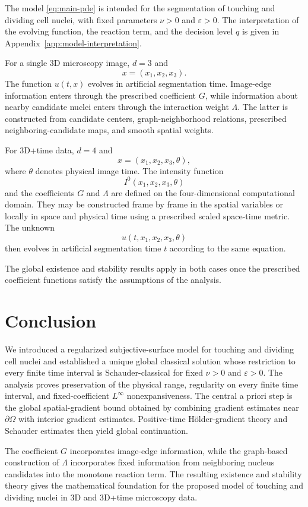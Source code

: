 \documentclass[11pt]{article}
\theoremstyle{remark}
\newcommand{\eps}{\varepsilon}
\newcommand{\nupar}{\nu}
\begin{document}
The model \eqref{eq:main-pde} is intended for the segmentation of touching
and dividing cell nuclei, with fixed parameters $\nupar>0$ and $\eps>0$.
The interpretation of the evolving function, the reaction term, and the
decision level $q$ is given in Appendix~\ref{app:model-interpretation}.

For a single 3D microscopy image, $d=3$ and
\[
x=(x_1,x_2,x_3).
\]
The function $u(t,x)$ evolves in artificial segmentation time. Image-edge
information enters through the prescribed coefficient $G$, while information
about nearby candidate nuclei enters through the interaction weight
$\Lambda$. The latter is constructed from candidate centers,
graph-neighborhood relations, prescribed neighboring-candidate maps, and
smooth spatial weights.

For 3D+time data, $d=4$ and
\[
x=(x_1,x_2,x_3,\theta),
\]
where $\theta$ denotes physical image time. The intensity function
\[
I^0(x_1,x_2,x_3,\theta)
\]
and the coefficients $G$ and $\Lambda$ are defined on the four-dimensional
computational domain. They may be constructed frame by frame in the spatial
variables or locally in space and physical time using a prescribed scaled
space-time metric. The unknown
\[
u(t,x_1,x_2,x_3,\theta)
\]
then evolves in artificial segmentation time $t$ according to the same
equation.

The global existence and stability results apply in both cases once the
prescribed coefficient functions satisfy the assumptions of the analysis.



\section{Conclusion}

We introduced a regularized subjective-surface model for touching and dividing cell nuclei and established a unique global classical solution whose restriction to every finite time interval is Schauder-classical for fixed $\nupar>0$ and $\eps>0$. The analysis proves preservation of the physical range, regularity on every finite time interval, and fixed-coefficient $L^\infty$ nonexpansiveness. The central a priori step is the global spatial-gradient bound obtained by combining gradient estimates near $\partial\Omega$ with interior gradient estimates. Positive-time H\"older-gradient theory and Schauder estimates then yield global continuation.

The coefficient $G$ incorporates image-edge information, while the graph-based construction of $\Lambda$ incorporates fixed information from neighboring nucleus candidates into the monotone reaction term. The resulting existence and stability theory gives the mathematical foundation for the proposed model of touching and dividing nuclei in 3D and 3D+time microscopy data.
\end{document}
